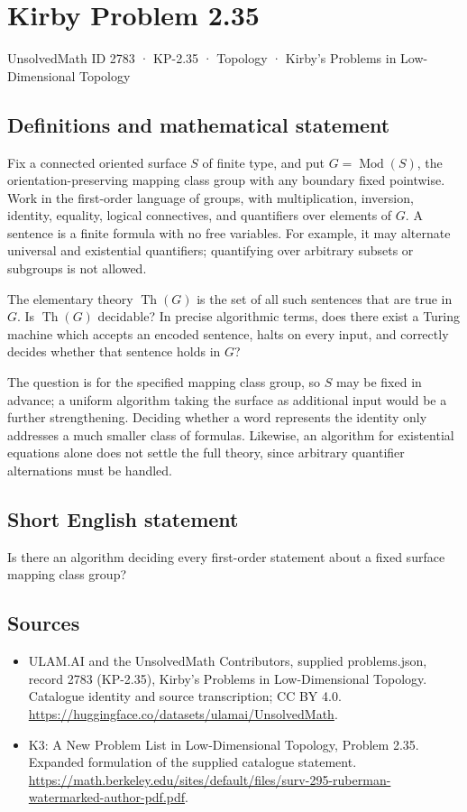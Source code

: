 \documentclass[11pt,a4paper]{article}
\begin{document}
\section*{Kirby Problem 2.35}\label{2783}
{\small UnsolvedMath ID 2783 · KP-2.35 · Topology · Kirby's Problems in Low-Dimensional Topology}
\subsection{Definitions and mathematical statement}
Fix a connected oriented surface $S$ of finite type, and put
$G=\operatorname{Mod}(S)$, the orientation-preserving mapping class group
with any boundary fixed pointwise. Work in the first-order language of groups,
with multiplication, inversion, identity, equality, logical connectives, and
quantifiers over elements of $G$. A sentence is a finite formula with no free
variables. For example, it may alternate universal and existential quantifiers;
quantifying over arbitrary subsets or subgroups is not allowed.

The elementary theory $\operatorname{Th}(G)$ is the set of all such sentences
that are true in $G$. Is $\operatorname{Th}(G)$ decidable? In precise algorithmic
terms, does there exist a Turing machine which accepts an encoded sentence,
halts on every input, and correctly decides whether that sentence holds in $G$?

The question is for the specified mapping class group, so $S$ may be fixed
in advance; a uniform algorithm taking the surface as additional input would
be a further strengthening. Deciding whether a word represents the identity
only addresses a much smaller class of formulas. Likewise, an algorithm for
existential equations alone does not settle the full theory, since arbitrary
quantifier alternations must be handled.
\subsection{Short English statement}
Is there an algorithm deciding every first-order statement about a fixed surface mapping class group?
\subsection{Sources}
\begin{itemize}
\item[S1] ULAM.AI and the UnsolvedMath Contributors, supplied problems.json, record 2783 (KP-2.35), Kirby's Problems in Low-Dimensional Topology. Catalogue identity and source transcription; CC BY 4.0.
\url{https://huggingface.co/datasets/ulamai/UnsolvedMath}.
\item[S2] K3: A New Problem List in Low-Dimensional Topology, Problem 2.35. Expanded formulation of the supplied catalogue statement.
\url{https://math.berkeley.edu/sites/default/files/surv-295-ruberman-watermarked-author-pdf.pdf}.
\end{itemize}
\end{document}
